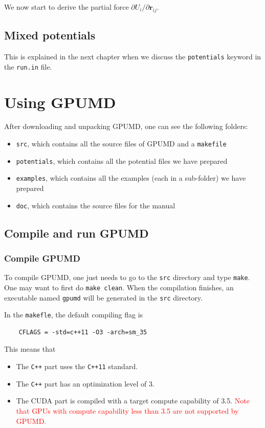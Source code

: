 \documentclass[12pt,a4paper]{report}
\newcommand{\vect}[1]{\boldsymbol{#1}}
\begin{document}
We now start to derive the partial force $\partial U_i/\partial \vect{r}_{ij}$.

\section{Mixed potentials}

This is explained in the next chapter when we discuss the \verb"potentials" keyword in the \verb"run.in" file.

\chapter{Using GPUMD \label{chapter:usage}}

After downloading and unpacking GPUMD, one can see the following folders:
\begin{itemize}
\item \verb"src", which contains all the source files of GPUMD and a \verb"makefile"
\item \verb"potentials", which contains all the potential files we have prepared
\item \verb"examples", which contains all the examples (each in a sub-folder) we have prepared
\item \verb"doc", which contains the source files for the manual
\end{itemize}

\section{Compile and run GPUMD}

\subsection{Compile GPUMD}

To compile GPUMD, one just needs to go to the \verb"src" directory and type \verb"make". One may want to first do \verb"make clean". When the compilation finishes, an executable named \verb"gpumd" will be generated in the \verb"src" directory.

In the \verb"makefle", the default compiling flag is
\begin{verbatim}
    CFLAGS = -std=c++11 -O3 -arch=sm_35
\end{verbatim}
This means that
\begin{itemize}
\item The \verb"C++" part uses the \verb"C++11" standard.
\item The \verb"C++" part has an optimization level of 3.
\item The CUDA part is compiled with a target compute capability of 3.5. \textcolor{red}{Note that GPUs with compute capability less than 3.5 are not supported by GPUMD.}
\end{itemize}
\end{document}
